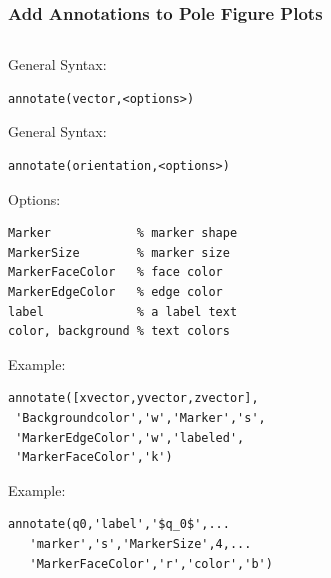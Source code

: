 \begin{frame}[fragile]
  \frametitle{Add Annotations to Pole Figure Plots}


\begin{columns}
  \begin{column}{8.5cm}

\begin{overprint}
  General Syntax:%
\begin{lstlisting}
annotate(vector,<options>)
\end{lstlisting}
  General Syntax:
\begin{lstlisting}
annotate(orientation,<options>)
\end{lstlisting}
\end{overprint}

Options:
\begin{lstlisting}
Marker            % marker shape
MarkerSize        % marker size
MarkerFaceColor   % face color
MarkerEdgeColor   % edge color
label             % a label text
color, background % text colors
\end{lstlisting}

\begin{overprint}
  Example:
\begin{lstlisting}
annotate([xvector,yvector,zvector],
 'Backgroundcolor','w','Marker','s',
 'MarkerEdgeColor','w','labeled',
 'MarkerFaceColor','k')
\end{lstlisting}

Example:
\begin{lstlisting}
annotate(q0,'label','$q_0$',...
   'marker','s','MarkerSize',4,...
   'MarkerFaceColor','r','color','b')
\end{lstlisting}

\end{overprint}

\end{column}


\end{columns}
\end{frame}
